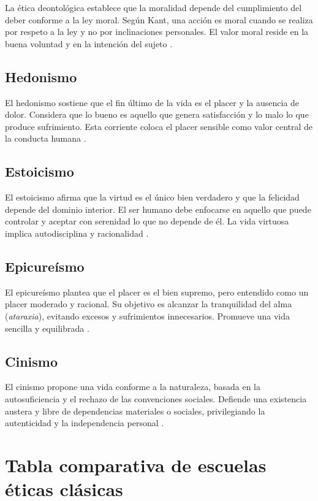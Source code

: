 \documentclass[
	spanish, %
	letterpaper, oneside
]{article}
\begin{document}
La ética deontológica establece que la moralidad depende del cumplimiento del deber conforme a la ley moral. Según Kant, una acción es moral cuando se realiza por respeto a la ley y no por inclinaciones personales. El valor moral reside en la buena voluntad y en la intención del sujeto \citep{huerta2000etica}.

\subsection*{Hedonismo}

El hedonismo sostiene que el fin último de la vida es el placer y la ausencia de dolor. Considera que lo bueno es aquello que genera satisfacción y lo malo lo que produce sufrimiento. Esta corriente coloca el placer sensible como valor central de la conducta humana \citep{huerta2000etica}.

\subsection*{Estoicismo}

El estoicismo afirma que la virtud es el único bien verdadero y que la felicidad depende del dominio interior. El ser humano debe enfocarse en aquello que puede controlar y aceptar con serenidad lo que no depende de él. La vida virtuosa implica autodisciplina y racionalidad \citep{huerta2000etica}.

\subsection*{Epicureísmo}

El epicureísmo plantea que el placer es el bien supremo, pero entendido como un placer moderado y racional. Su objetivo es alcanzar la tranquilidad del alma (\textit{ataraxia}), evitando excesos y sufrimientos innecesarios. Promueve una vida sencilla y equilibrada \citep{huerta2000etica}.

\subsection*{Cinismo}

El cinismo propone una vida conforme a la naturaleza, basada en la autosuficiencia y el rechazo de las convenciones sociales. Defiende una existencia austera y libre de dependencias materiales o sociales, privilegiando la autenticidad y la independencia personal \citep{huerta2000etica}.

\section{Tabla comparativa de escuelas éticas clásicas}
\end{document}
